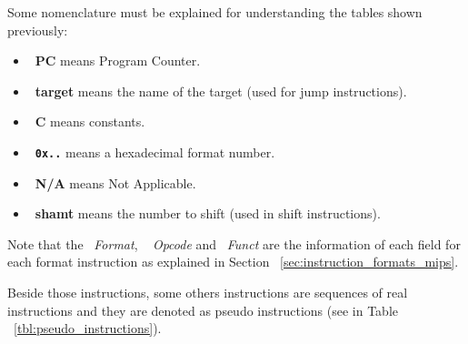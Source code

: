 \documentclass[
  oneside,
  11pt, a4paper,
  footinclude=true,
  headinclude=true,
  cleardoublepage=empty
]{scrbook}
\begin{document}
\newpage
Some nomenclature must be explained for understanding the tables shown previously:
\begin{itemize}
\item ~\textbf{PC} means Program Counter.
\item ~\textbf{target} means the name of the target (used for jump instructions).
\item ~\textbf{C} means constants.
\item ~\textbf{\texttt{0x..}} means a hexadecimal format number.
\item ~\textbf{N/A} means Not Applicable.
\item ~\textbf{shamt} means the number to shift (used in shift instructions).
\end{itemize} 
Note that the ~\textit{Format}, ~\textit{ Opcode} and ~\textit{Funct} are the information of each field for each format instruction as explained in Section ~\ref{sec:instruction_formats_mips}.

Beside those instructions, some others instructions are sequences of real instructions and they are denoted as pseudo instructions (see in Table ~\ref{tbl:pseudo_instructions}).
\end{document}
